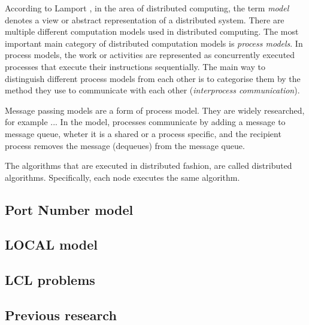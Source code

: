 According to Lamport \cite{DBLP:books/el/leeuwen90/LamportL90}, in the area of distributed computing, the term \emph{model} denotes a view or abstract representation of a distributed system.
There are multiple different computation models used in distributed computing.
The most important main category of distributed computation models is \emph{process models}.
In process models, the work or activities are represented as concurrently executed processes that execute their instructions sequentially.
The main way to distinguish different process models from each other is to categorise them by the method they use to communicate with each other (\emph{interprocess communication}).
\cite{DBLP:books/el/leeuwen90/LamportL90}

Message passing models are a form of process model.
They are widely researched, for example ... 
In the model, processes communicate by adding a message to message queue, wheter it is a shared or a process specific, and the recipient process removes the message (dequeues) from the message queue.
\cite{DBLP:books/el/leeuwen90/LamportL90}




The algorithms that are executed in distributed fashion, are called distributed algorithms. 
Specifically, each node executes the same algorithm.


\subsection{Port Number model} \label{sec:port_number_model}
\subsection{LOCAL model} \label{sec:local_model}
\subsection{LCL problems} \label{sec:lcl_problems}
\subsection{Previous research} \label{sec:previous_research}
\clearpage
